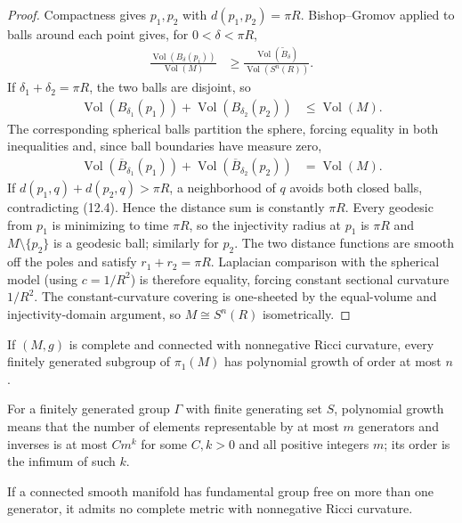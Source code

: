 \begin{proof}
\sketch
Compactness gives $p_1,p_2$ with $d(p_1,p_2)=\pi R$.  Bishop--Gromov applied
to balls around each point gives, for $0<\delta<\pi R$,
\begin{align}
\frac{\operatorname{Vol}(B_\delta(p_i))}{\operatorname{Vol}(M)}
&\geq\frac{\operatorname{Vol}(\widetilde B_\delta)}
{\operatorname{Vol}(S^n(R))}. \label{eq:12.2}
\end{align}
If $\delta_1+\delta_2=\pi R$, the two balls are disjoint, so
\begin{align}
\operatorname{Vol}(B_{\delta_1}(p_1))
+\operatorname{Vol}(B_{\delta_2}(p_2))&\leq\operatorname{Vol}(M). \label{eq:12.3}
\end{align}
The corresponding spherical balls partition the sphere, forcing equality in
both inequalities and, since ball boundaries have measure zero,
\begin{align}
\operatorname{Vol}(\overline B_{\delta_1}(p_1))
+\operatorname{Vol}(\overline B_{\delta_2}(p_2))&=\operatorname{Vol}(M). \label{eq:12.4}
\end{align}
If $d(p_1,q)+d(p_2,q)>\pi R$, a neighborhood of $q$ avoids both closed balls,
contradicting (12.4).  Hence the distance sum is constantly $\pi R$.
Every geodesic from $p_1$ is minimizing to time $\pi R$, so the injectivity
radius at $p_1$ is $\pi R$ and $M\setminus\{p_2\}$ is a geodesic ball; similarly
for $p_2$.  The two distance functions are smooth off the poles and satisfy
$r_1+r_2=\pi R$.  Laplacian comparison with the spherical model (using
$c=1/R^2$) is therefore equality, forcing constant sectional curvature
$1/R^2$.  The constant-curvature covering is one-sheeted by the equal-volume
and injectivity-domain argument, so $M\cong S^n(R)$ isometrically.
\end{proof}

\begin{theorem}[Milnor]
\label{thm:milnor-polynomial-growth}
If $(M,g)$ is complete and connected with nonnegative Ricci curvature, every
finitely generated subgroup of $\pi_1(M)$ has polynomial growth of order at
most $n$.
\end{theorem}

For a finitely generated group $\Gamma$ with finite generating set $S$,
polynomial growth means that the number of elements representable by at most
$m$ generators and inverses is at most $Cm^k$ for some $C,k>0$ and all positive
integers $m$; its order is the infimum of such $k$.

\begin{corollary}
\label{cor:free-fund-group-no-ric-metric}
If a connected smooth manifold has fundamental group free on more than one
generator, it admits no complete metric with nonnegative Ricci curvature.
\end{corollary}

